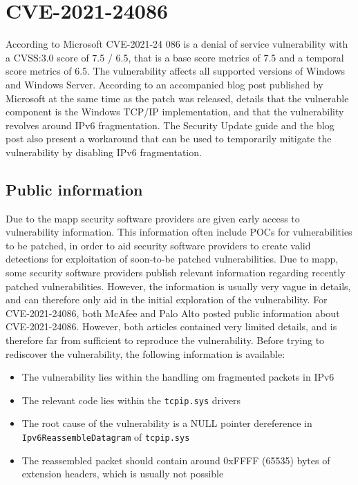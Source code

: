 \documentclass{report}
\begin{document}
\section{CVE-2021-24086}
\label{sec:CVE-2021-24086}
According to Microsoft\cite{url:microsoft:cve-2021-24086} CVE-2021-24 086 is a denial of service vulnerability with a CVSS:3.0 score of 7.5 / 6.5, that is a base score metrics of 7.5 and a temporal score metrics of 6.5. The vulnerability affects all supported versions of Windows and Windows Server. According to an accompanied blog post published by Microsoft
\cite{url:microsoft:cve-2021-24086-blog} at the same time as the patch was released, details that the vulnerable component is the Windows TCP/IP implementation, and that the vulnerability revolves around IPv6 fragmentation. The Security Update guide and the blog post also present a workaround that can be used to temporarily mitigate the vulnerability by disabling IPv6 fragmentation.

\subsection{Public information}
\label{sec:CVE-2021-24086:public-information}
Due to the \gls{mapp}\cite{url:microsoft:mapp} security software providers are given early access to vulnerability information. This information often include \gls{POC}s for vulnerabilities to be patched, in order to aid security software providers to create valid detections for exploitation of soon-to-be patched vulnerabilities. Due to \gls{mapp}, some security software providers publish relevant information regarding recently patched vulnerabilities. However, the information is usually very vague in details, and can therefore only aid in the initial exploration of the vulnerability. For CVE-2021-24086, both McAfee\cite{url:mcafee:cve-2021-24086} and Palo Alto\cite{url:palo-alto:cve-2021-24086} posted public information about CVE-2021-24086. However, both articles contained very limited details, and is therefore far from sufficient to reproduce the vulnerability. Before trying to rediscover the vulnerability, the following information is available:

\begin{itemize}
    \item The vulnerability lies within the handling om fragmented packets in IPv6
    \item The relevant code lies within the \texttt{tcpip.sys} drivers
    \item The root cause of the vulnerability is a NULL pointer dereference in \texttt{Ipv6ReassembleDatagram} of \texttt{tcpip.sys}
    \item The reassembled packet should contain around 0xFFFF (65535) bytes of extension headers, which is usually not possible
\end{itemize}
 
\end{document}
